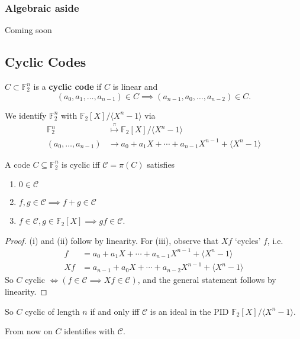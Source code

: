\documentclass{article}
\newcommand{\F}{\mathbb{F}}
\newcommand{\1}[1]{\mathbbm{1}_{#1}}
\begin{document}
\subsubsection*{Algebraic aside}
Coming soon
\begin{nlemma}\label{lem:2.27}
\end{nlemma}
\begin{nlemma}\label{lem:2.28}
\end{nlemma}

\subsection{Cyclic Codes}
\begin{defi}
    $C \subset \F_2^n$ is a \textbf{cyclic code} if $C$ is linear and
    \begin{equation*}
        (a_0, a_1, \dotsc, a_{n-1}) \in C \implies (a_{n-1}, a_0, \dotsc, a_{n-2}) \in C.
    \end{equation*}
\end{defi}
We identify $\F_2^n$ with $\F_2[X]/\langle X^n - 1 \rangle$ via
\begin{align*}
    \F_2^n &\overset{\pi}{\longmapsto} \F_2[X]/\langle X^n - 1 \rangle \\
    (a_0, \dotsc, a_{n-1}) &\longrightarrow a_0 + a_1 X + \dotsb + a_{n-1} X^{n-1} + \langle X^n - 1 \rangle
\end{align*}

\begin{nlemma}\label{lem:2.29}
    A code $C \subseteq \F_2^n$ is cyclic iff $\mathcal{C} = \pi(C)$ satisfies
    \begin{enumerate}[label=(\roman*)]
        \item $0 \in \mathcal{C}$
        \item $f, g \in \mathcal{C} \implies f+g \in \mathcal{C}$
        \item $f \in \mathcal{C}, g \in \F_2[X] \implies g f \in \mathcal{C}$.
    \end{enumerate}
\end{nlemma}
\begin{proof}
    (i) and (ii) follow by linearity.
    For (iii), observe that $Xf$ `cycles' $f$, i.e.\
    \begin{align*}
        f &= a_0 + a_1 X + \dotsb + a_{n-1} X^{n-1} + \langle X^n - 1 \rangle\\
        Xf &= a_{n-1} + a_0 X + \dotsb + a_{n-2} X^{n-1} + \langle X^n - 1 \rangle
    \end{align*}
    So $C$ cyclic $\iff (f \in \mathcal{C} \implies Xf \in \mathcal{C})$, and the general statement follows by linearity.
\end{proof}
\begin{remark}
    So $C$ cyclic of length $n$ if and only iff $\mathcal{C}$ is an ideal in the PID $\F_2[X]/\langle X^n - 1 \rangle$.
\end{remark}
From now on $C$ identifies with $\mathcal{C}$.
\end{document}
